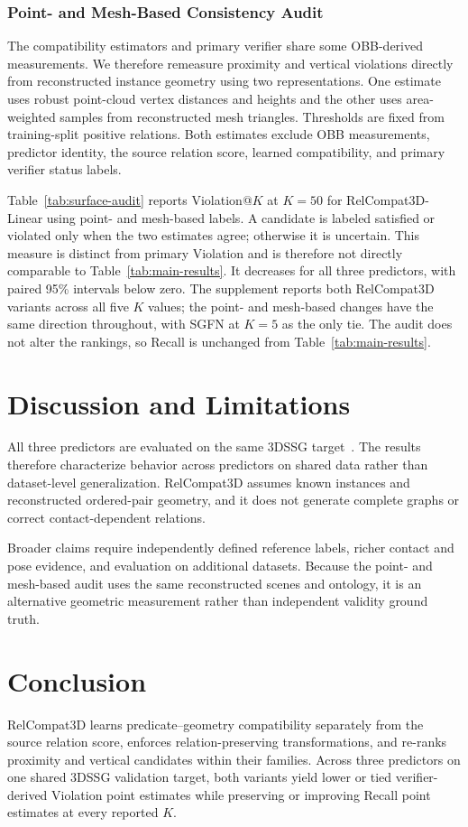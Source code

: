 \subsubsection{Point- and Mesh-Based Consistency Audit}
The compatibility estimators and primary verifier share some OBB-derived measurements. We therefore remeasure proximity and vertical violations directly from reconstructed instance geometry using two representations. One estimate uses robust point-cloud vertex distances and heights and the other uses area-weighted samples from reconstructed mesh triangles. Thresholds are fixed from training-split positive relations. Both estimates exclude OBB measurements, predictor identity, the source relation score, learned compatibility, and primary verifier status labels.

Table~\ref{tab:surface-audit} reports Violation@$K$ at $K=50$ for
RelCompat3D-Linear using point- and mesh-based labels. A candidate is labeled satisfied or violated only when the two estimates agree; otherwise it is uncertain. This measure is distinct from primary Violation and is therefore not directly comparable to Table~\ref{tab:main-results}. It decreases for all three predictors, with paired 95\% intervals below zero. The supplement reports both
RelCompat3D variants across all five $K$ values; the point- and mesh-based changes have the same direction throughout, with SGFN at $K=5$ as the only tie. The audit does not alter the rankings, so Recall is unchanged from Table~\ref{tab:main-results}.

\section{Discussion and Limitations}

All three predictors are evaluated on the same 3DSSG target~\cite{wald2020learning}. The results therefore characterize behavior across predictors on shared data rather than dataset-level generalization. RelCompat3D assumes known instances and reconstructed ordered-pair geometry, and it does not generate complete graphs or correct contact-dependent relations.
 
Broader claims require independently defined reference labels, richer contact and pose evidence, and evaluation on additional datasets. Because the point- and mesh-based audit uses the same reconstructed scenes and ontology, it is an alternative geometric measurement rather than independent validity ground truth.

\section{Conclusion}
RelCompat3D learns predicate--geometry compatibility separately from the source relation score, enforces relation-preserving transformations, and re-ranks proximity and vertical candidates within their families. Across three predictors on one shared 3DSSG validation target, both variants yield lower or tied verifier-derived Violation point estimates while preserving or improving Recall point estimates at every reported $K$.


